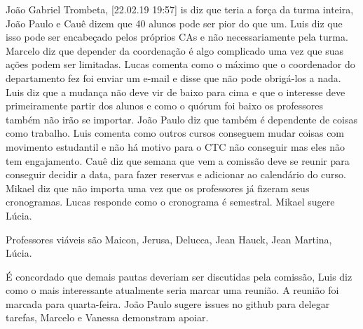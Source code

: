 \documentclass{ata-calico}
\begin{document}
João Gabriel Trombeta, [22.02.19 19:57]
is diz que teria a força da turma inteira, João Paulo e Cauê dizem que 40 alunos pode ser pior do que um. Luis diz que isso pode ser encabeçado pelos próprios CAs e não necessariamente pela turma. Marcelo diz que depender da coordenação é algo complicado uma vez que suas ações podem ser limitadas. Lucas comenta como o máximo que o coordenador do departamento fez foi enviar um e-mail e disse que não pode obrigá-los a nada. Luis diz que a mudança não deve vir de baixo para cima e que o interesse deve primeiramente partir dos alunos e como o quórum foi baixo os professores também não irão se importar. João Paulo diz que também é dependente de coisas como trabalho. Luis comenta como outros cursos conseguem mudar coisas com movimento estudantil e não há motivo para o CTC não conseguir mas eles não tem engajamento. Cauê diz que semana que vem a comissão deve se reunir para conseguir decidir a data, para fazer reservas e adicionar ao calendário do curso. Mikael diz que não importa uma vez que os professores já fizeram seus cronogramas. Lucas responde como o cronograma é semestral. Mikael sugere Lúcia.

Professores viáveis são Maicon, Jerusa, Delucca, Jean Hauck, Jean Martina, Lúcia.

É concordado que demais pautas deveriam ser discutidas pela comissão, Luis diz como o mais interessante atualmente seria marcar uma reunião. A reunião foi marcada para quarta-feira. João Paulo sugere issues no github para delegar tarefas, Marcelo e Vanessa demonstram apoiar.

\end{document}
